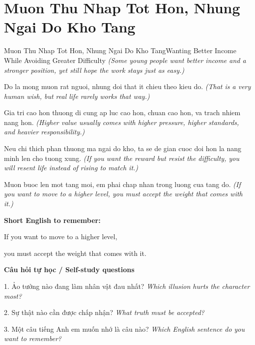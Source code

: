 \section{Muon Thu Nhap Tot Hon, Nhung Ngai Do Kho Tang}
\begin{truyen}{Muon Thu Nhap Tot Hon, Nhung Ngai Do Kho Tang}{Wanting Better Income While Avoiding Greater Difficulty}
\textit{(Some young people want better income and a stronger position, yet still hope the work stays just as easy.)}

Do la mong muon rat nguoi, nhung doi that it chieu theo kieu do.
\textit{(That is a very human wish, but real life rarely works that way.)}

Gia tri cao hon thuong di cung ap luc cao hon, chuan cao hon, va trach nhiem nang hon.
\textit{(Higher value usually comes with higher pressure, higher standards, and heavier responsibility.)}

Neu chi thich phan thuong ma ngai do kho, ta se de gian cuoc doi hon la nang minh len cho tuong xung.
\textit{(If you want the reward but resist the difficulty, you will resent life instead of rising to match it.)}

\end{truyen}

\begin{baihoc}
Muon buoc len mot tang moi, em phai chap nhan trong luong cua tang do.
\textit{(If you want to move to a higher level, you must accept the weight that comes with it.)}
\end{baihoc}

\begin{ghinhoanh}
\textbf{Short English to remember:}

If you want to move to a higher level,

you must accept the weight that comes with it.

\end{ghinhoanh}

\begin{tuhocnhanh}
\textbf{Câu hỏi tự học / Self-study questions}

1. Ảo tưởng nào đang làm nhân vật đau nhất? \textit{Which illusion hurts the character most?}

2. Sự thật nào cần được chấp nhận? \textit{What truth must be accepted?}

3. Một câu tiếng Anh em muốn nhớ là câu nào? \textit{Which English sentence do you want to remember?}
\end{tuhocnhanh}
\ngancach

